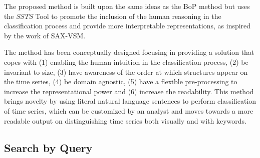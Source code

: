 \par
The proposed method is built upon the same ideas as the BoP method but uses the \textit{SSTS} Tool to promote the inclusion of the human reasoning in the classification process and provide more interpretable representations, as inspired by the work of SAX-VSM.
\par
The method has been conceptually designed focusing in providing a solution that copes with (1) enabling the human intuition in the classification process, (2) be invariant to size, (3) have awareness of the order at which structures appear on the time series, (4) be domain agnostic, (5) have a flexible pre-processing to increase the representational power and (6) increase the readability. This method brings novelty by using literal natural language sentences to perform classification of time series, which can be customized by an analyst and moves towards a more readable output on distinguishing time series both visually and with keywords.

\subsection{Search by Query}

